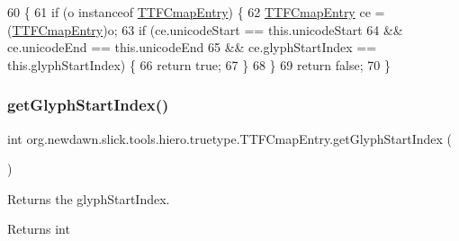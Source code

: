 \begin{DoxyCode}
60                                     \{
61         \textcolor{keywordflow}{if} (o instanceof \mbox{\hyperlink{classorg_1_1newdawn_1_1slick_1_1tools_1_1hiero_1_1truetype_1_1_t_t_f_cmap_entry_adb6f5da92279a3d136d4c30863e587c9}{TTFCmapEntry}}) \{
62             \mbox{\hyperlink{classorg_1_1newdawn_1_1slick_1_1tools_1_1hiero_1_1truetype_1_1_t_t_f_cmap_entry_adb6f5da92279a3d136d4c30863e587c9}{TTFCmapEntry}} ce = (\mbox{\hyperlink{classorg_1_1newdawn_1_1slick_1_1tools_1_1hiero_1_1truetype_1_1_t_t_f_cmap_entry_adb6f5da92279a3d136d4c30863e587c9}{TTFCmapEntry}})o;
63             \textcolor{keywordflow}{if} (ce.unicodeStart == \textcolor{keyword}{this}.unicodeStart
64                     && ce.unicodeEnd == \textcolor{keyword}{this}.unicodeEnd
65                     && ce.glyphStartIndex == \textcolor{keyword}{this}.glyphStartIndex) \{
66                 \textcolor{keywordflow}{return} \textcolor{keyword}{true};
67             \}
68         \}
69         \textcolor{keywordflow}{return} \textcolor{keyword}{false};
70     \}
\end{DoxyCode}
\mbox{\label{classorg_1_1newdawn_1_1slick_1_1tools_1_1hiero_1_1truetype_1_1_t_t_f_cmap_entry_a3132591c7a4eabb7d05b3b0ba1d35876}} 
\subsubsection{\texorpdfstring{get\+Glyph\+Start\+Index()}{getGlyphStartIndex()}}
{\footnotesize\ttfamily int org.\+newdawn.\+slick.\+tools.\+hiero.\+truetype.\+T\+T\+F\+Cmap\+Entry.\+get\+Glyph\+Start\+Index (\begin{DoxyParamCaption}{ }\end{DoxyParamCaption})\hspace{0.3cm}{\ttfamily [inline]}}

Returns the glyph\+Start\+Index. \begin{DoxyReturn}{Returns}
int 
\end{DoxyReturn}

